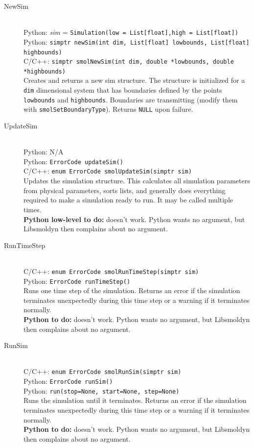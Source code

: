 \documentclass {book}
\newcommand {\ttt} {\texttt}
\begin{document}
\begin{description}

\item[NewSim]
\hfill \\
Python: \textit{sim} = \ttt{Simulation(low = List[float],high = List[float])}\\
Python: \ttt{simptr newSim(int dim, List[float] lowbounds, List[float] highbounds)}\\
C/C++: \ttt{simptr smolNewSim(int dim, double *lowbounds, double *highbounds)}\\
Creates and returns a new sim structure. The structure is initialized for a \ttt{dim} dimensional system that has boundaries defined by the points \ttt{lowbounds} and \ttt{highbounds}. Boundaries are transmitting (modify them with \ttt{smolSetBoundaryType}). Returns \ttt{NULL} upon failure.

\item[UpdateSim]
\hfill \\
Python: N/A\\
Python: \ttt{ErrorCode updateSim()}\\
C/C++: \ttt{enum ErrorCode smolUpdateSim(simptr sim)}\\
Updates the simulation structure. This calculates all simulation parameters from physical parameters, sorts lists, and generally does everything required to make a simulation ready to run. It may be called multiple times.\\
\textbf{Python low-level to do:} doesn't work. Python wants no argument, but Libsmoldyn then complains about no argument.

\item[RunTimeStep]
\hfill \\
C/C++: \ttt{enum ErrorCode smolRunTimeStep(simptr sim)}\\
Python: \ttt{ErrorCode runTimeStep()}\\
Runs one time step of the simulation. Returns an error if the simulation terminates unexpectedly during this time step or a warning if it terminates normally.\\
\textbf{Python to do:} doesn't work. Python wants no argument, but Libsmoldyn then complains about no argument.

\item[RunSim]
\hfill \\
C/C++: \ttt{enum ErrorCode smolRunSim(simptr sim)}\\
Python: \ttt{ErrorCode runSim()}\\
Python: \ttt{run(stop=None, start=None, step=None)}\\
Runs the simulation until it terminates. Returns an error if the simulation terminates unexpectedly during this time step or a warning if it terminates normally.\\
\textbf{Python to do:} doesn't work. Python wants no argument, but Libsmoldyn then complains about no argument.


\end{description}
\end{document}
